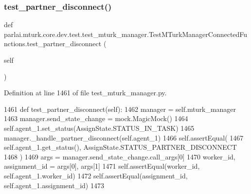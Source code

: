 \subsubsection{\texorpdfstring{test\+\_\+partner\+\_\+disconnect()}{test\_partner\_disconnect()}}
{\footnotesize\ttfamily def parlai.\+mturk.\+core.\+dev.\+test.\+test\+\_\+mturk\+\_\+manager.\+Test\+M\+Turk\+Manager\+Connected\+Functions.\+test\+\_\+partner\+\_\+disconnect (\begin{DoxyParamCaption}\item[{}]{self }\end{DoxyParamCaption})}



Definition at line 1461 of file test\+\_\+mturk\+\_\+manager.\+py.


\begin{DoxyCode}
1461     \textcolor{keyword}{def }test\_partner\_disconnect(self):
1462         manager = self.mturk\_manager
1463         manager.send\_state\_change = mock.MagicMock()
1464         self.agent\_1.set\_status(AssignState.STATUS\_IN\_TASK)
1465         manager.\_handle\_partner\_disconnect(self.agent\_1)
1466         self.assertEqual(
1467             self.agent\_1.get\_status(), AssignState.STATUS\_PARTNER\_DISCONNECT
1468         )
1469         args = manager.send\_state\_change.call\_args[0]
1470         worker\_id, assignment\_id = args[0], args[1]
1471         self.assertEqual(worker\_id, self.agent\_1.worker\_id)
1472         self.assertEqual(assignment\_id, self.agent\_1.assignment\_id)
1473 
\end{DoxyCode}
\mbox{\label{classparlai_1_1mturk_1_1core_1_1dev_1_1test_1_1test__mturk__manager_1_1TestMTurkManagerConnectedFunctions_ad71616be59c93693599aa84f3f2d9393}} 
